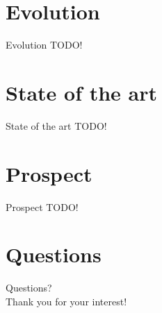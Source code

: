 \documentclass[10pt]{beamer}
\begin{document}
\section{Evolution}
\begin{frame}[fragile]{Evolution}
	TODO!	
\end{frame}

\section{State of the art}
\begin{frame}[fragile]{State of the art}
	TODO!	
\end{frame}

\section{Prospect}
\begin{frame}[fragile]{Prospect}
	TODO!	
\end{frame}

\section{Questions}
\begin{frame}[standout]
	Questions? \\
	Thank you for your interest!
\end{frame}
\end{document}
